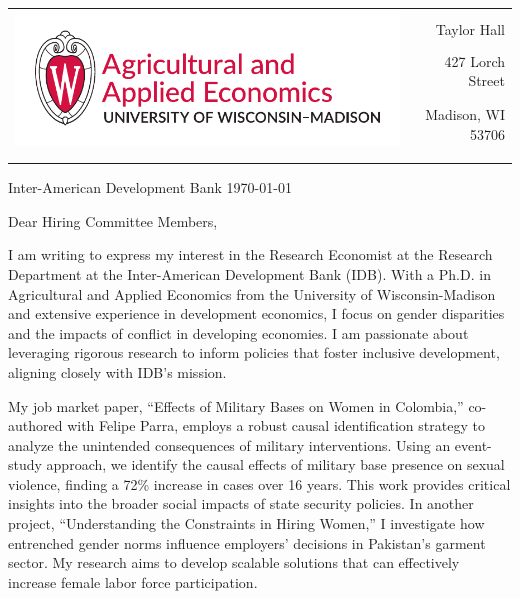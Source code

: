 \documentclass[12pt]{letter}
\begin{document}
\begin{tabularx}{\textwidth}{Xr}
\multirow{4}{*}{\includegraphics[height=3\baselineskip]{logo_cropped.pdf}} &  \\
& Taylor Hall \\
& 427 Lorch Street \\
& Madison, WI 53706 \\
[-1.8ex]\\
\\
\end{tabularx}

\newcommand{\instName}{IDB}
\newcommand{\posName}{Research Economist}


Inter-American Development Bank \hfill \today \\

\medskip

Dear Hiring Committee Members,

I am writing to express my interest in the \posName \hspace{1mm} at the Research Department at the Inter-American Development Bank (\instName). 
With a Ph.D. in Agricultural and Applied Economics from the University of Wisconsin-Madison and extensive experience 
in development economics, I focus on gender disparities and the impacts of conflict in developing economies. 
I am passionate about leveraging rigorous research to inform policies that foster inclusive development, 
aligning closely with \instName's mission.

My job market paper, ``Effects of Military Bases on Women in Colombia,'' co-authored with Felipe Parra, employs 
a robust causal identification strategy to analyze the unintended consequences of military interventions. 
Using an event-study approach, we identify the causal effects of military base presence on sexual violence, finding 
a 72\% increase in cases over 16 years. This work provides critical insights into the broader social impacts of 
state security policies. In another project, ``Understanding the Constraints in Hiring Women,'' I investigate how entrenched gender 
norms influence employers' decisions in Pakistan's garment sector. 
My research aims to develop scalable solutions that can effectively increase female labor force participation.
\end{document}

